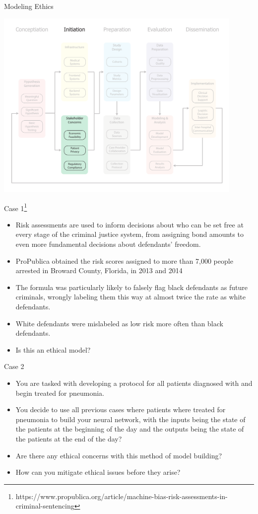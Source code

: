 \documentclass[10pt, xcolor=table]{beamer}
\begin{document}
\begin{frame}{Modeling Ethics}
	\begin{center}
		\includegraphics[width=0.9\textwidth]{images/informatics_pipeline_model_ethics.pdf}	
	\end{center}
\end{frame}


\begin{frame}{Case 1\footnote{https://www.propublica.org/article/machine-bias-risk-assessments-in-criminal-sentencing}}
	\begin{itemize}
		\item Risk assessments are used to inform decisions about who can be set free at every stage of the criminal justice system, from assigning bond amounts to even more fundamental decisions about defendants' freedom. 
		\item ProPublica obtained the risk scores assigned to more than 7,000 people arrested in Broward County, Florida, in 2013 and 2014 
		\item The formula was particularly likely to falsely flag black defendants as future criminals, wrongly labeling them this way at almost twice the rate as white defendants.
		\item White defendants were mislabeled as low risk more often than black defendants.
		\item Is this an ethical model?
	\end{itemize}
\end{frame}

\begin{frame}{Case 2}
	\begin{itemize}
		\item You are tasked with developing a protocol for all patients diagnosed with and begin treated for pneumonia.
		\item You decide to use all previous cases where patients where treated for pneumonia to build your neural network, with the inputs being the state of the patients at the beginning of the day and the outputs being the state of the patients at the end of the day?
		\item Are there any ethical concerns with this method of model building?
		\item How can you mitigate ethical issues before they arise?  
	\end{itemize}
\end{frame}
\end{document}
